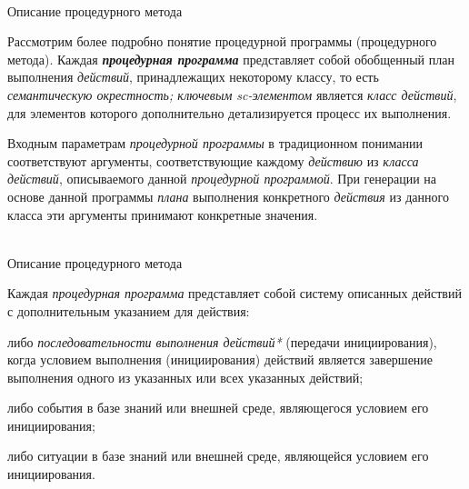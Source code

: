 \begin{frame}{\\Описание процедурного метода}
	\topline
	\justifying
 
    \vspace{0.33cm}
    
    Рассмотрим более подробно понятие процедурной программы (процедурного метода). Каждая \textbf{\textit{процедурная программа}} представляет собой обобщенный план выполнения \textit{действий}, принадлежащих некоторому классу, то есть \textit{семантическую окрестность; ключевым sc-элементом\scnrolesign} является \textit{класс действий}, для элементов которого дополнительно детализируется процесс их выполнения.
    
    \vspace{0.33cm}
    
    Входным параметрам \textit{процедурной программы} в традиционном понимании соответствуют аргументы, соответствующие каждому \textit{действию} из \textit{класса действий}, описываемого данной \textit{процедурной программой}. При генерации на основе данной программы \textit{плана} выполнения конкретного \textit{действия} из данного класса эти аргументы принимают конкретные значения.
\end{frame}

\begin{frame}{\\Описание процедурного метода}
	\topline
	\justifying
    \vspace{0.33cm}
    
     Каждая \textit{процедурная программа} представляет собой систему описанных действий с дополнительным указанием для действия:
    \begin{textitemize}
        \item либо \textit{последовательности выполнения действий*} (передачи инициирования), когда условием выполнения (инициирования) действий является завершение выполнения одного из указанных или всех указанных действий;
        \item либо события в базе знаний или внешней среде, являющегося условием его инициирования;
        \item либо ситуации в базе знаний или внешней среде, являющейся условием его инициирования.
    \end{textitemize}
\end{frame}

	
